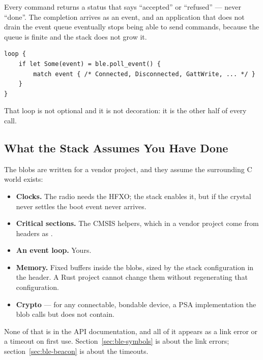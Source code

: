 Every command returns a status that says ``accepted'' or ``refused'' — never ``done''. The completion
arrives as an event, and an application that does not drain the event queue eventually stops being
able to send commands, because the queue is finite and the stack does not grow it.

\begin{verbatim}
loop {
    if let Some(event) = ble.poll_event() {
        match event { /* Connected, Disconnected, GattWrite, ... */ }
    }
}
\end{verbatim}

That loop is not optional and it is not decoration: it is the other half of every call.

\subsection{What the Stack Assumes You Have Done}

The blobs are written for a vendor project, and they assume the surrounding C world exists:

\begin{itemize}
    \item \textbf{Clocks.} The radio needs the HFXO; the stack enables it, but if the crystal never
          settles the boot event never arrives.
    \item \textbf{Critical sections.} The CMSIS  helpers, which in a vendor
          project come from headers as .
    \item \textbf{An event loop.} Yours.
    \item \textbf{Memory.} Fixed buffers inside the blobs, sized by the stack configuration in the
          header. A Rust project cannot change them without regenerating that configuration.
    \item \textbf{Crypto} — for any connectable, bondable device, a PSA implementation the blob calls
          but does not contain.
\end{itemize}

None of that is in the API documentation, and all of it appears as a link error or a timeout on first
use. Section~\ref{sec:ble-symbols} is about the link errors; section~\ref{sec:ble-beacon} is about the
timeouts.
